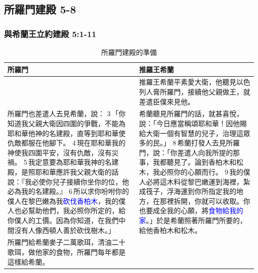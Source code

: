 \subsection{所羅門建殿 5-8 }
\subsubsection{與希蘭王立約建殿 5:1-11}
\begin{table}[!hbp]
\centering
\begin{tabular}{p{9cm}|p{8cm}}\hline\hline
所羅門&推羅王希蘭\\\hline\hline
&推羅王希蘭平素愛大衛，他聽見以色列人膏所羅門，接續他父親做王，就差遣臣僕來見他。\\\hline
所羅門也差遣人去見希蘭，說： 3 「你知道我父親大衛因四圍的爭戰，不能為耶和華他神的名建殿，直等到耶和華使仇敵都服在他腳下。 4 現在耶和華我的神使我四圍平安，沒有仇敵，沒有災禍。 5 我定意要為耶和華我神的名建殿，是照耶和華應許我父親大衛的話說：『我必使你兒子接續你坐你的位，他必為我的名建殿。』 6 所以求你吩咐你的僕人在黎巴嫩為我\textcolor{blue}{砍伐香柏木}，我的僕人也必幫助他們，我必照你所定的，給你僕人的工價。因為你知道，在我們中間沒有人像西頓人善於砍伐樹木。」&希蘭聽見所羅門的話，就甚喜悅，說：「今日應當稱頌耶和華！因他賜給大衛一個有智慧的兒子，治理這眾多的民。」 8 希蘭打發人去見所羅門，說：「你差遣人向我所提的那事，我都聽見了。論到香柏木和松木，我必照你的心願而行。 9 我的僕人必將這木料從黎巴嫩運到海裡，紮成筏子，浮海運到你所指定我的地方，在那裡拆開，你就可以收取。你也要成全我的心願，將\textcolor{blue}{食物給我的家}。」於是希蘭照著所羅門所要的，給他香柏木和松木。\\\hline
所羅門給希蘭麥子二萬歌珥，清油二十歌珥，做他家的食物，所羅門每年都是這樣給希蘭。&\\\hline
\end{tabular}
\caption{所羅門建殿的準備}
\end{table}


